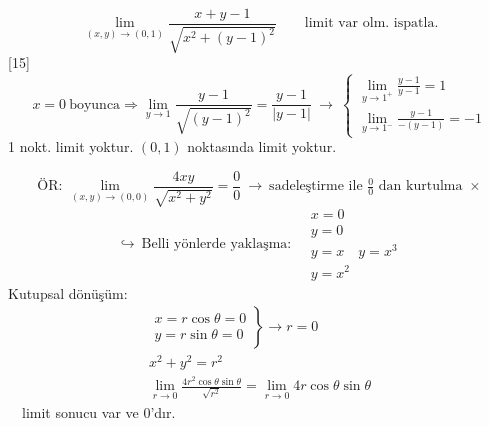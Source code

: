 \documentclass[11pt,a4paper]{article}
\begin{document}
\[ \lim_{(x,y)\to(0,1)}\frac{x+y-1}{\sqrt{x^2+(y-1)^2}}\qquad\text{limit var olm. ispatla.} \]
[15]
\[ x=0\ \text{boyunca}\Rightarrow\lim_{y\to1}\frac{y-1}{\sqrt{(y-1)^2}}=\frac{y-1}{|y-1|}\ \to\ \begin{cases}\displaystyle\lim_{y\to1^+}\frac{y-1}{y-1}=1\\[2mm]\displaystyle\lim_{y\to1^-}\frac{y-1}{-(y-1)}=-1\end{cases} \]
1 nokt. limit yoktur. $(0,1)$ noktasında limit yoktur.

\[ \text{ÖR: }\lim_{(x,y)\to(0,0)}\frac{4xy}{\sqrt{x^2+y^2}}=\frac00\ \to\ \text{sadeleştirme ile }\tfrac00\text{ dan kurtulma }\times \]
\[ \hookrightarrow\ \text{Belli yönlerde yaklaşma:}\quad\begin{array}{l}x=0\\ y=0\\ y=x\quad y=x^3\\ y=x^2\end{array} \]
Kutupsal dönüşüm:
\begin{gather*}
\left.\begin{array}{l}x=r\cos\theta=0\\ y=r\sin\theta=0\end{array}\right\}\to r=0\\
x^2+y^2=r^2\\
\lim_{r\to0}\frac{4r^2\cos\theta\sin\theta}{\sqrt{r^2}}=\lim_{r\to0}4r\cos\theta\sin\theta
\end{gather*}
\ \ limit sonucu var ve 0'dır.
\end{document}
